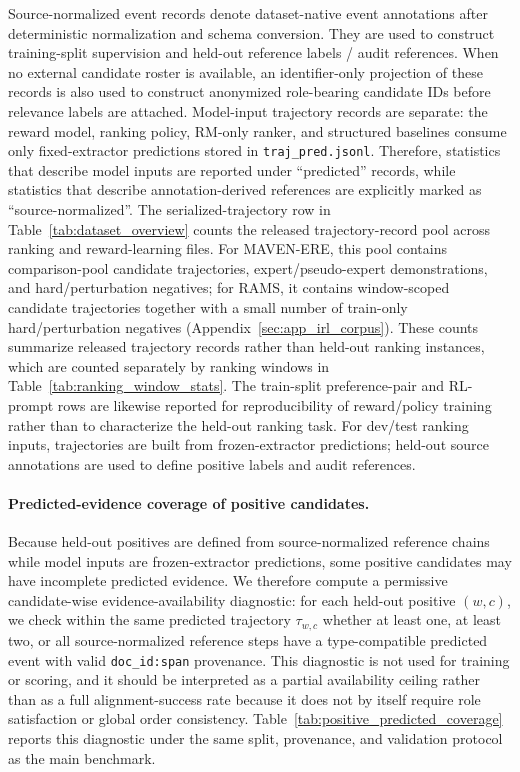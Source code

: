 \documentclass{article}
\begin{document}
Source-normalized event records denote dataset-native event annotations after deterministic normalization and schema conversion.
They are used to construct training-split supervision and held-out reference labels / audit references.
When no external candidate roster is available, an identifier-only projection of these records is also used to construct anonymized role-bearing candidate IDs before relevance labels are attached.
Model-input trajectory records are separate: the reward model, ranking policy, RM-only ranker, and structured baselines consume only fixed-extractor predictions stored in \texttt{traj\_pred.jsonl}.
Therefore, statistics that describe model inputs are reported under ``predicted'' records, while statistics that describe annotation-derived references are explicitly marked as ``source-normalized''.
The serialized-trajectory row in Table~\ref{tab:dataset_overview} counts the released trajectory-record pool across ranking and reward-learning files.
For MAVEN-ERE, this pool contains comparison-pool candidate trajectories, expert/pseudo-expert demonstrations, and hard/perturbation negatives; for RAMS, it contains window-scoped candidate trajectories together with a small number of train-only hard/perturbation negatives (Appendix~\ref{sec:app_irl_corpus}).
These counts summarize released trajectory records rather than held-out ranking instances, which are counted separately by ranking windows in Table~\ref{tab:ranking_window_stats}.
The train-split preference-pair and RL-prompt rows are likewise reported for reproducibility of reward/policy training rather than to characterize the held-out ranking task.
For dev/test ranking inputs, trajectories are built from frozen-extractor predictions; held-out source annotations are used to define positive labels and audit references.

\paragraph{Predicted-evidence coverage of positive candidates.}
Because held-out positives are defined from source-normalized reference chains while model inputs are frozen-extractor predictions, some positive candidates may have incomplete predicted evidence.
We therefore compute a permissive candidate-wise evidence-availability diagnostic: for each held-out positive $(w,c)$, we check within the same predicted trajectory $\tau_{w,c}$ whether at least one, at least two, or all source-normalized reference steps have a type-compatible predicted event with valid \texttt{doc\_id:span} provenance.
This diagnostic is not used for training or scoring, and it should be interpreted as a partial availability ceiling rather than as a full alignment-success rate because it does not by itself require role satisfaction or global order consistency.
Table~\ref{tab:positive_predicted_coverage} reports this diagnostic under the same split, provenance, and validation protocol as the main benchmark.
\end{document}
